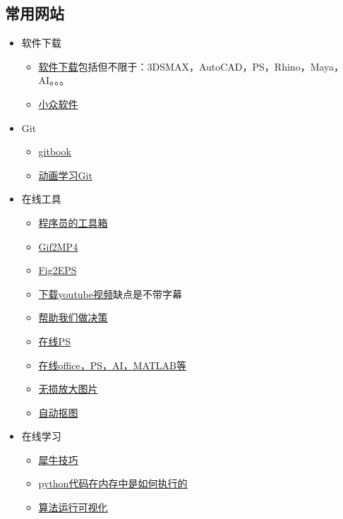 \documentclass[UTF8,oneside]{ctexbook}
\begin{document}
\subsection{常用网站}
\begin{itemize}
	\item 软件下载
	\begin{itemize}
		\item \href{https://www.3d66.com/popsoft_26.html}{软件下载}\quad 包括但不限于：3DSMAX，AutoCAD，PS，Rhino，Maya，AI。。。
		\item \href{https://www.appinn.com/category/windows/}{小众软件}
	\end{itemize}
	\item Git
	\begin{itemize}
		\item \href{http://gitbook.liuhui998.com/index.html}{gitbook}
		\item \href{https://learngitbranching.js.org/?demo}{动画学习Git}
	\end{itemize}
	\item 在线工具
	\begin{itemize}
		\item \href{https://tool.lu}{程序员的工具箱}
		\item \href{https://cloudconvert.com/gif-to-mp4}{Gif2MP4}
		\item \href{https://cn.office-converter.com/FIG-to-EPS}{Fig2EPS}
		\item \href{http://www.ytube.win}{下载youtube视频}\quad 缺点是不带字幕
		\item \href{https://www.slant.co}{帮助我们做决策}
		\item \href{https://www.photopea.com}{在线PS}
		\item \href{https://uzer.me/u/signin}{在线office，PS，AI，MATLAB等}
		\item \href{https://bigjpg.com}{无损放大图片}
		\item \href{https://www.remove.bg}{自动抠图}
	\end{itemize}
	\item 在线学习
	\begin{itemize}
		\item \href{http://www.xuexiniu.com/forum.php?mod=forumdisplay&fid=102&filter=typeid&typeid=1}{犀牛技巧}
		\item \href{http://www.pythontutor.com}{python代码在内存中是如何执行的}
		\item \href{https://algorithm-visualizer.org}{算法运行可视化}
	\end{itemize}
\end{itemize}
\end{document}
